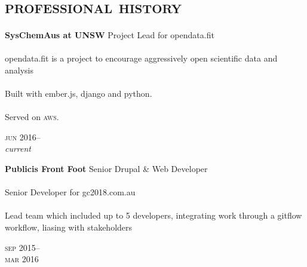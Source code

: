 
\vspace{-0.6cm}
\section*{\textsc{professional history}}
\vspace{-0.2cm}

\begin{minipage}[t]{0.70\textwidth}
\textbf{SysChemAus at UNSW}\phantom{..} Project Lead for opendata.fit \\
\\
opendata.fit is a project to encourage aggressively open scientific data and 
analysis 
\\
\\
Built with ember.js, django and python. \\
\\
Served on \textsc{aws}. 
{\small
\textit{}
\par}
\end{minipage}
\begin{minipage}[t]{0.30\textwidth}
{
\hfill \textsc{jun} 2016--\\ 
\hspace*{0pt} \hfill \textit{current}
\par
}
\end{minipage}
\vspace{0.2in}


\begin{minipage}[t]{0.70\textwidth}
\textbf{Publicis Front Foot}\phantom{..} Senior Drupal \& Web Developer \\
\\
Senior Developer for gc2018.com.au
\\
\\
Lead team which included up to 5 developers, integrating work through a gitflow workflow, liasing with stakeholders
\\
{\small
\textit{}
\par}
\end{minipage}
\begin{minipage}[t]{0.30\textwidth}
{
\hfill \textsc{sep} 2015--\\ 
\hspace*{0pt} \hfill \textsc{mar} 2016
\par
}
\end{minipage}
\vspace{0.2in}


